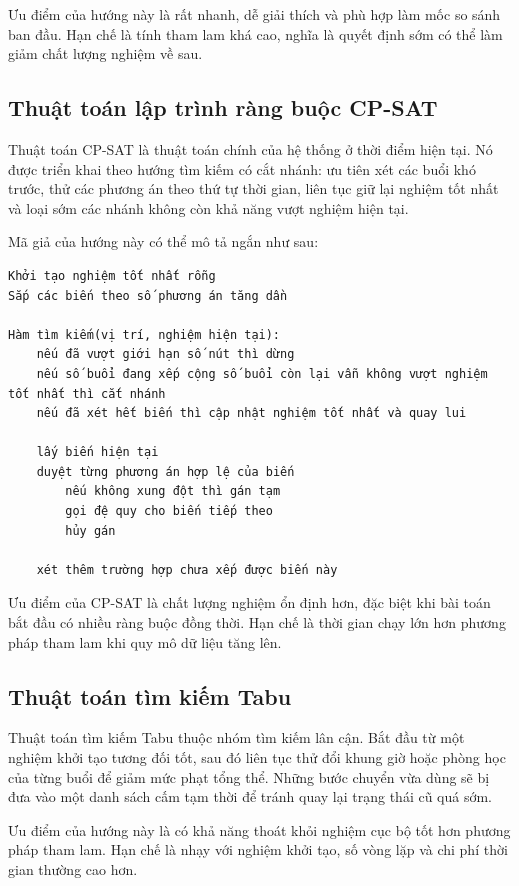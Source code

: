 \documentclass[../DoAn.tex]{subfiles}
\begin{document}
Ưu điểm của hướng này là rất nhanh, dễ giải thích và phù hợp làm mốc so sánh ban đầu. Hạn chế là tính tham lam khá cao, nghĩa là quyết định sớm có thể làm giảm chất lượng nghiệm về sau.

\subsection{Thuật toán lập trình ràng buộc CP-SAT}
Thuật toán CP-SAT là thuật toán chính của hệ thống ở thời điểm hiện tại. Nó được triển khai theo hướng tìm kiếm có cắt nhánh: ưu tiên xét các buổi khó trước, thử các phương án theo thứ tự thời gian, liên tục giữ lại nghiệm tốt nhất và loại sớm các nhánh không còn khả năng vượt nghiệm hiện tại.

Mã giả của hướng này có thể mô tả ngắn như sau:
\begin{verbatim}
Khởi tạo nghiệm tốt nhất rỗng
Sắp các biến theo số phương án tăng dần

Hàm tìm kiếm(vị trí, nghiệm hiện tại):
    nếu đã vượt giới hạn số nút thì dừng
    nếu số buổi đang xếp cộng số buổi còn lại vẫn không vượt nghiệm tốt nhất thì cắt nhánh
    nếu đã xét hết biến thì cập nhật nghiệm tốt nhất và quay lui

    lấy biến hiện tại
    duyệt từng phương án hợp lệ của biến
        nếu không xung đột thì gán tạm
        gọi đệ quy cho biến tiếp theo
        hủy gán

    xét thêm trường hợp chưa xếp được biến này
\end{verbatim}

Ưu điểm của CP-SAT là chất lượng nghiệm ổn định hơn, đặc biệt khi bài toán bắt đầu có nhiều ràng buộc đồng thời. Hạn chế là thời gian chạy lớn hơn phương pháp tham lam khi quy mô dữ liệu tăng lên.

\subsection{Thuật toán tìm kiếm Tabu}
Thuật toán tìm kiếm Tabu thuộc nhóm tìm kiếm lân cận. Bắt đầu từ một nghiệm khởi tạo tương đối tốt, sau đó liên tục thử đổi khung giờ hoặc phòng học của từng buổi để giảm mức phạt tổng thể. Những bước chuyển vừa dùng sẽ bị đưa vào một danh sách cấm tạm thời để tránh quay lại trạng thái cũ quá sớm.

Ưu điểm của hướng này là có khả năng thoát khỏi nghiệm cục bộ tốt hơn phương pháp tham lam. Hạn chế là nhạy với nghiệm khởi tạo, số vòng lặp và chi phí thời gian thường cao hơn.
\end{document}
